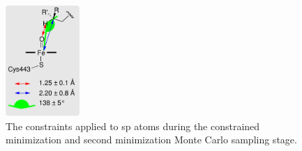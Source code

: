 \begin{figure}[hp]
\centering
\includegraphics[width=0.25\textwidth]{figures/idsite/34a}
\caption{The constraints applied to sp atoms during the constrained minimization and second minimization Monte Carlo sampling stage.}
\label{figure:second_sp3_constraints}
\end{figure}

